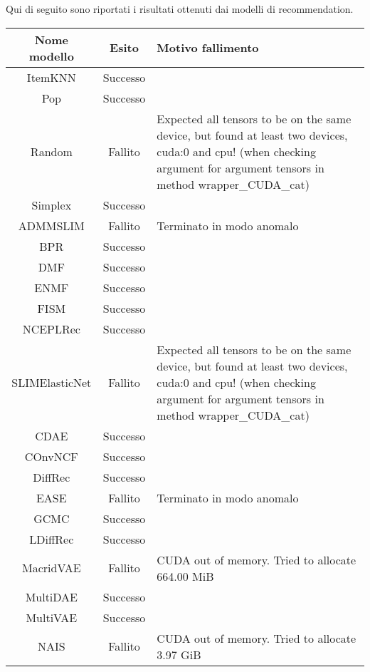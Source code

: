 Qui di seguito sono riportati i risultati ottenuti dai modelli di recommendation.
\begin{table}[H]
    \centering
    \footnotesize
    \begin{tabularx}{\textwidth}{|c|c|X|}
        \hline
        \textbf{Nome modello} & \textbf{Esito} & \textbf{Motivo fallimento} \\
        \hline
        ItemKNN & Successo &  \\
        \hline
        Pop & Successo &  \\
        \hline
        Random & Fallito &  Expected all tensors to be on the same device, but found at least two devices, cuda:0 and cpu! (when checking argument for argument tensors in method wrapper\_CUDA\_cat) \\
        \hline
        Simplex & Successo &  \\
        \hline
        ADMMSLIM & Fallito & Terminato in modo anomalo \\
        \hline
        BPR & Successo &  \\
        \hline
        DMF & Successo &  \\
        \hline
        ENMF & Successo &  \\
        \hline
        FISM & Successo &  \\
        \hline
        NCEPLRec & Successo &  \\
        \hline
        SLIMElasticNet & Fallito &  Expected all tensors to be on the same device, but found at least two devices, cuda:0 and cpu! (when checking argument for argument tensors in method wrapper\_CUDA\_cat) \\
        \hline
        CDAE & Successo &  \\
        \hline
        COnvNCF & Successo &  \\
        \hline
        DiffRec & Successo &  \\
        \hline
        EASE & Fallito & Terminato in modo anomalo \\
        \hline
        GCMC & Successo &  \\
        \hline
        LDiffRec & Successo &  \\
        \hline
        MacridVAE & Fallito &  CUDA out of memory. Tried to allocate 664.00 MiB \\
        \hline
        MultiDAE & Successo &  \\
        \hline
        MultiVAE & Successo &  \\
        \hline
        NAIS & Fallito & CUDA out of memory. Tried to allocate 3.97 GiB \\

\end{tabularx}
\end{table}
